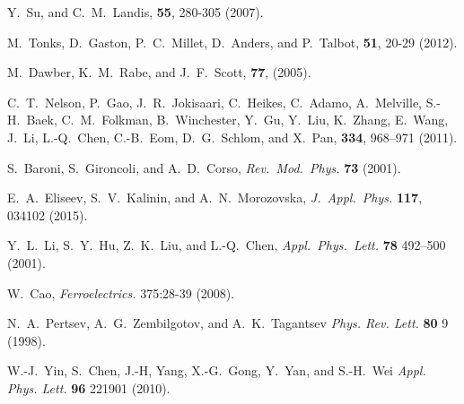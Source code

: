 \documentclass[16pt]{article} %
\begin{document}
\begin{thebibliography}{1}
Y.~Su, and C.~M.~Landis,
 \textbf{55}, 280-305 (2007).

M.~Tonks, D.~Gaston, P.~C.~Millet, D.~Anders, and P.~Talbot,
 \textbf{51}, 20-29 (2012).

M.~Dawber, K.~M.~Rabe, and J.~F.~Scott,
 \textbf{77}, (2005).

C.~T.~Nelson, P.~Gao, J.~R.~Jokisaari, C.~Heikes, C.~Adamo, A.~Melville, S.-H.~Baek, C.~M.~Folkman, B.~Winchester, Y.~Gu, Y.~Liu, K.~Zhang, 
E.~Wang, J.~Li, L.-Q.~Chen, C.-B.~Eom, D.~G.~Schlom, and X.~Pan,
 \textbf{334}, 968--971 (2011).

S.~Baroni, S.~Gironcoli, and A.~D.~Corso,
\newblock \emph{Rev.~Mod.~Phys.} \textbf{73} (2001).

E.~A.~Eliseev, S.~V.~Kalinin, and A.~N.~Morozovska,
\newblock \emph{J.~Appl.~Phys.} \textbf{117}, 034102 (2015).

Y.~L.~Li, S.~Y.~Hu, Z.~K.~Liu, and L.-Q.~Chen,
\newblock \emph{Appl.~Phys.~Lett.} \textbf{78} 492--500 (2001).

W.~Cao,
\newblock \emph{Ferroelectrics.} 375:28-39 (2008).

N.~A.~Pertsev, A.~G.~Zembilgotov, and A.~K.~Tagantsev
\newblock \emph{Phys. Rev. Lett.} \textbf{80} 9 (1998).

W.-J.~Yin, S.~Chen, J.-H, Yang, X.-G.~Gong, Y.~Yan, and S.-H.~Wei
\newblock \emph{Appl. Phys. Lett.} \textbf{96} 221901 (2010).


\end{thebibliography}
\end{document}
